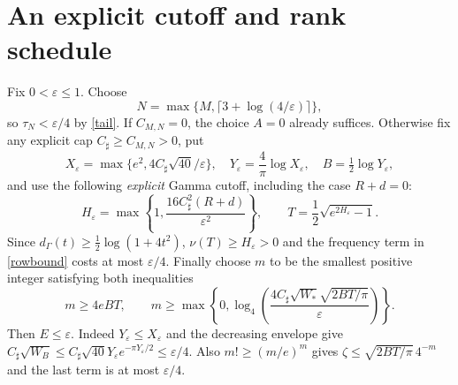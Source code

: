 \documentclass[11pt]{article}
\begin{document}
\section{An explicit cutoff and rank schedule}\label{sec:schedule}
Fix $0<\varepsilon\le1$. Choose
\begin{equation}\label{schedule1}
 N=\max\{M,\lceil3+\log(4/\varepsilon)\rceil\},
\end{equation}
so $\tau_N<\varepsilon/4$ by \eqref{tail}. If $C_{M,N}=0$, the choice $A=0$ already suffices. Otherwise fix any explicit cap $C_\sharp\ge C_{M,N}>0$, put
\begin{equation}\label{schedule2}
 X_\varepsilon=\max\{e^2,4C_\sharp\sqrt{40}/\varepsilon\},\quad
 Y_\varepsilon=\frac4\pi\log X_\varepsilon,\quad B=\tfrac12\log Y_\varepsilon,
\end{equation}
and use the following \emph{explicit} Gamma cutoff, including the case $R+d=0$:
\begin{equation}\label{explicitT}
 H_\varepsilon=\max\left\{1,\frac{16C_\sharp^2(R+d)}{\varepsilon^2}\right\},\qquad
 T=\frac12\sqrt{e^{2H_\varepsilon}-1}.
\end{equation}
Since $d_\Gamma(t)\ge\frac12\log(1+4t^2)$, $\nu(T)\ge H_\varepsilon>0$ and the frequency term in \eqref{rowbound} costs at most $\varepsilon/4$. Finally choose $m$ to be the smallest positive integer satisfying both inequalities
\begin{equation}\label{schedule3}
 m\ge4eBT,\qquad m\ge\max\left\{0,\log_4\!\left(\frac{4C_\sharp\sqrt{W_*}\sqrt{2BT/\pi}}{\varepsilon}\right)\right\}.
\end{equation}
Then $E\le\varepsilon$. Indeed $Y_\varepsilon\le X_\varepsilon$ and the decreasing envelope give $C_\sharp\sqrt{W_B}\le C_\sharp\sqrt{40}Y_\varepsilon e^{-\pi Y_\varepsilon/2}\le\varepsilon/4$. Also $m!\ge(m/e)^m$ gives $\zeta\le\sqrt{2BT/\pi}\,4^{-m}$ and the last term is at most $\varepsilon/4$.
\end{document}
